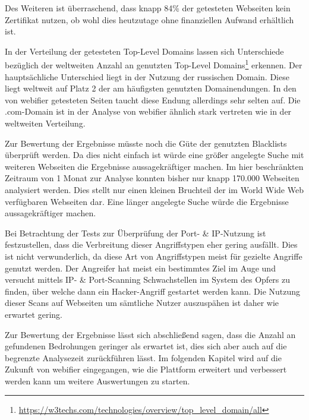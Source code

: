 Des Weiteren ist überraschend, dass knapp 84\% der getesteten Webseiten kein Zertifikat nutzen, ob wohl dies heutzutage ohne finanziellen Aufwand erhältlich ist.

In der Verteilung der getesteten Top-Level Domains lassen sich Unterschiede bezüglich der weltweiten
Anzahl an genutzten Top-Level
Domains\footnote{\url{https://w3techs.com/technologies/overview/top_level_domain/all}} erkennen. Der
hauptsächliche Unterschied liegt in der Nutzung der russischen Domain. Diese liegt weltweit auf Platz 2 der am häufigsten genutzten Domainendungen. In den von webifier getesteten Seiten taucht diese Endung allerdings sehr selten auf. Die .com-Domain ist in der Analyse von webifier ähnlich stark vertreten wie in der weltweiten Verteilung.

Zur Bewertung der Ergebnisse müsste noch die Güte der genutzten Blacklists überprüft werden. Da dies nicht einfach ist würde eine größer angelegte Suche mit weiteren Webseiten die Ergebnisse aussagekräftiger machen. Im hier beschränkten Zeitraum von 1 Monat zur Analyse konnten bisher nur knapp 170.000 Webseiten analysiert werden. Dies stellt nur einen kleinen Bruchteil der im World Wide Web verfügbaren Webseiten dar. Eine länger angelegte Suche würde die Ergebnisse aussagekräftiger machen.

Bei Betrachtung der Tests zur Überprüfung der Port- \& IP-Nutzung ist festzustellen, dass die Verbreitung dieser Angriffstypen eher gering ausfällt. Dies ist nicht verwunderlich, da diese Art von Angriffstypen meist für gezielte Angriffe genutzt werden. Der Angreifer hat meist ein bestimmtes Ziel im Auge und versucht mittels IP- \& Port-Scanning Schwachstellen im System des Opfers zu finden, über welche dann ein Hacker-Angriff gestartet werden kann. Die Nutzung dieser Scans auf Webseiten um sämtliche Nutzer auszuspähen ist daher wie erwartet gering.

Zur Bewertung der Ergebnisse lässt sich abschließend sagen, dass die Anzahl an gefundenen Bedrohungen geringer als erwartet ist, dies sich aber auch auf die begrenzte Analysezeit zurückführen lässt. Im folgenden Kapitel wird auf die Zukunft von webifier eingegangen, wie die Plattform erweitert und verbessert werden kann um weitere Auswertungen zu starten.
